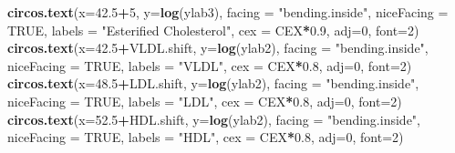 \documentclass[
]{article}
\newenvironment{Shaded}{\begin{snugshade}}{\end{snugshade}}
\newcommand{\DataTypeTok}[1]{\textcolor[rgb]{0.13,0.29,0.53}{#1}}
\newcommand{\DecValTok}[1]{\textcolor[rgb]{0.00,0.00,0.81}{#1}}
\newcommand{\FloatTok}[1]{\textcolor[rgb]{0.00,0.00,0.81}{#1}}
\newcommand{\KeywordTok}[1]{\textcolor[rgb]{0.13,0.29,0.53}{\textbf{#1}}}
\newcommand{\NormalTok}[1]{#1}
\newcommand{\OperatorTok}[1]{\textcolor[rgb]{0.81,0.36,0.00}{\textbf{#1}}}
\newcommand{\OtherTok}[1]{\textcolor[rgb]{0.56,0.35,0.01}{#1}}
\newcommand{\StringTok}[1]{\textcolor[rgb]{0.31,0.60,0.02}{#1}}
\begin{document}
\begin{Shaded}
\begin{Highlighting}[]
\KeywordTok{circos.text}\NormalTok{(}\DataTypeTok{x=}\FloatTok{42.5}\OperatorTok{+}\DecValTok{5}\NormalTok{, }\DataTypeTok{y=}\KeywordTok{log}\NormalTok{(ylab3), }\DataTypeTok{facing =} \StringTok{"bending.inside"}\NormalTok{, }\DataTypeTok{niceFacing =} \OtherTok{TRUE}\NormalTok{, }\DataTypeTok{labels =} \StringTok{"Esterified Cholesterol"}\NormalTok{, }\DataTypeTok{cex =}\NormalTok{ CEX}\OperatorTok{*}\FloatTok{0.9}\NormalTok{, }\DataTypeTok{adj=}\DecValTok{0}\NormalTok{, }\DataTypeTok{font=}\DecValTok{2}\NormalTok{)}
\KeywordTok{circos.text}\NormalTok{(}\DataTypeTok{x=}\FloatTok{42.5}\OperatorTok{+}\NormalTok{VLDL.shift, }\DataTypeTok{y=}\KeywordTok{log}\NormalTok{(ylab2), }\DataTypeTok{facing =} \StringTok{"bending.inside"}\NormalTok{, }\DataTypeTok{niceFacing =} \OtherTok{TRUE}\NormalTok{, }\DataTypeTok{labels =} \StringTok{"VLDL"}\NormalTok{, }\DataTypeTok{cex =}\NormalTok{ CEX}\OperatorTok{*}\FloatTok{0.8}\NormalTok{, }\DataTypeTok{adj=}\DecValTok{0}\NormalTok{, }\DataTypeTok{font=}\DecValTok{2}\NormalTok{)}
\KeywordTok{circos.text}\NormalTok{(}\DataTypeTok{x=}\FloatTok{48.5}\OperatorTok{+}\NormalTok{LDL.shift, }\DataTypeTok{y=}\KeywordTok{log}\NormalTok{(ylab2), }\DataTypeTok{facing =} \StringTok{"bending.inside"}\NormalTok{, }\DataTypeTok{niceFacing =} \OtherTok{TRUE}\NormalTok{, }\DataTypeTok{labels =} \StringTok{"LDL"}\NormalTok{, }\DataTypeTok{cex =}\NormalTok{ CEX}\OperatorTok{*}\FloatTok{0.8}\NormalTok{, }\DataTypeTok{adj=}\DecValTok{0}\NormalTok{, }\DataTypeTok{font=}\DecValTok{2}\NormalTok{)}
\KeywordTok{circos.text}\NormalTok{(}\DataTypeTok{x=}\FloatTok{52.5}\OperatorTok{+}\NormalTok{HDL.shift, }\DataTypeTok{y=}\KeywordTok{log}\NormalTok{(ylab2), }\DataTypeTok{facing =} \StringTok{"bending.inside"}\NormalTok{, }\DataTypeTok{niceFacing =} \OtherTok{TRUE}\NormalTok{, }\DataTypeTok{labels =} \StringTok{"HDL"}\NormalTok{, }\DataTypeTok{cex =}\NormalTok{ CEX}\OperatorTok{*}\FloatTok{0.8}\NormalTok{, }\DataTypeTok{adj=}\DecValTok{0}\NormalTok{, }\DataTypeTok{font=}\DecValTok{2}\NormalTok{) }


\end{Highlighting}
\end{Shaded}
\end{document}
